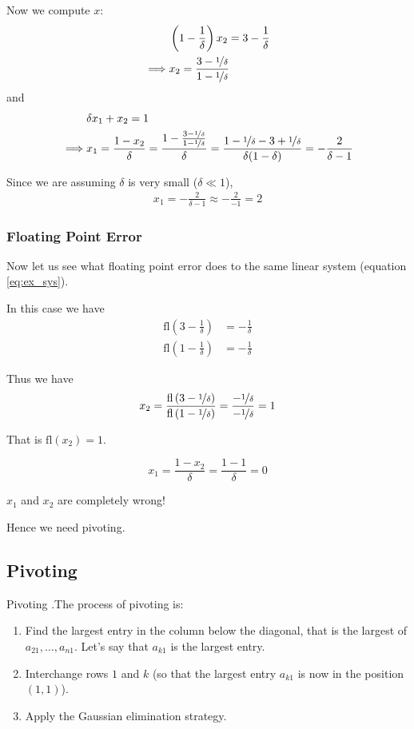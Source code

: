 \documentclass[12pt,letterpaper]{article}
\newcommand{\fl}{\mathrm{fl}}
\begin{document}
Now we compute $x$:
\begin{align}
	&\left(1 - \frac{1}{\delta}\right) x_2 = 3 - \frac{1}{\delta} \\
	\implies & x_2 = \frac{3 - \nicefrac{1}{\delta}}{1 - \nicefrac{1}{\delta}}
\end{align}
and
\begin{align}
	& \delta x_1 + x_2 = 1 \\
	\implies & x_1 = \frac{1 - x_2}{\delta} = \frac{1 - \frac{3 - \nicefrac{1}{\delta}}{1 - \nicefrac{1}{\delta}}}{\delta}
	= \frac{1 - \nicefrac{1}{\delta} - 3 + \nicefrac{1}{\delta}}{\delta (1 - \delta)} = -\frac{2}{\delta-1}
\end{align}

Since we are assuming $\delta$ is very small ($\delta \ll 1$),
\begin{align}
	x_1 = -\frac{2}{\delta-1} \approx -\frac{2}{-1} = 2
\end{align}

\subsubsection{Floating Point Error}
Now let us see what floating point error does to the same linear system (equation \ref{eq:ex_sys}).

In this case we have
\begin{align}
	\fl\left(3 - \frac{1}{\delta}\right) &= -\frac{1}{\delta} \\
	\fl\left(1 - \frac{1}{\delta}\right) &= -\frac{1}{\delta}
\end{align}

Thus we have
\begin{equation}
	x_2 = \frac{\fl\left( 3 - \nicefrac{1}{\delta} \right)}{\fl\left( 1- \nicefrac{1}{\delta} \right)}
	= \frac{-\nicefrac{1}{\delta}}{-\nicefrac{1}{\delta}} = 1
\end{equation}

That is $\fl(x_2) = 1$.

\begin{equation}
	x_1 = \frac{1 - x_2}{\delta} = \frac{1-1}{\delta} = 0
\end{equation}

$x_1$ and $x_2$ are completely wrong!

Hence we need pivoting.

\subsection{Pivoting}
\begin{algo}{Pivoting}
.The process of pivoting is:
\begin{enumerate}
	\item Find the largest entry in the column below the diagonal, that is the largest of $a_{21}, \dots, a_{n1}$. Let's say that $a_{k1}$ is the largest entry.
	\item Interchange rows $1$ and $k$ (so that the largest entry $a_{k1}$ is now in the position $(1,1)$).
	\item Apply the Gaussian elimination strategy.
\end{enumerate}
\label{alg:pivoting}
\end{algo}
\end{document}
